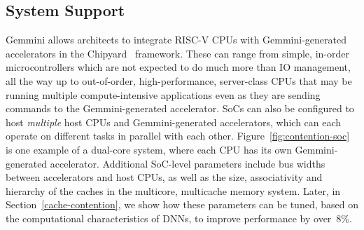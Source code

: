 \subsection{System Support}
\label{system}




Gemmini allows architects to integrate RISC-V CPUs %
with Gemmini-generated accelerators in the Chipyard~\cite{chipyard} framework.
These can range from simple, in-order microcontrollers which are not expected to do much more than IO management, all the way up to out-of-order, high-performance, server-class CPUs that may be running multiple compute-intensive applications even as they are sending commands to the Gemmini-generated accelerator.
SoCs can also be configured to host \textit{multiple} host CPUs and Gemmini-generated accelerators, which can each operate on different tasks in parallel with each other. Figure~\ref{fig:contention-soc} is one example of a dual-core system, where each CPU has its own Gemmini-generated accelerator.
Additional SoC-level parameters include bus widths between accelerators and host CPUs, as well as the size, associativity and hierarchy of the caches in the multicore, multicache memory system. Later, in Section~\ref{cache-contention}, we show how these parameters can be tuned, based on the computational characteristics of DNNs, to improve performance by over~8\%.


